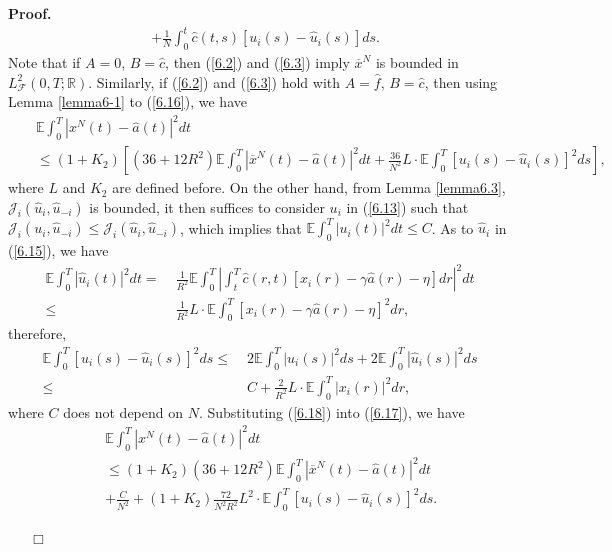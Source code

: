 \documentclass[11pt]{article}
\newenvironment{proof}[1][Proof]{\noindent \textbf{#1.} }{\ \ \  $\Box$}
\def\dbE{\mathbb{E}}
\def\dbR{\mathbb{R}}
\begin{document}
\begin{proof}
\begin{align}
& +\frac{1}{N}\int_{0}^{t}\widehat{c}(t,s)[u_{i}(s)-\widehat{u}_{i}(s)]ds. \label{6.16}
\end{align}
%
Note that if $A=0$, $B=\widehat{c}$, then (\ref{6.2}) and
(\ref{6.3}) imply $\overline{x}^N$ is bounded in
$L^2_{\mathcal{F}}(0,T;\dbR).$ Similarly, if (\ref{6.2}) and
(\ref{6.3}) hold with  $A=\widehat{f}$, $B=\widehat{c}$, then using
Lemma \ref{lemma6-1} to (\ref{6.16}), we have
%
\begin{eqnarray}\label{6.17}
&&\dbE\int_{0}^{T}|x^{N}(t)-\widehat{a}(t)|^{2}dt \nonumber\\ &&\leq
(1+K_2)\left[(36+12R^2)\dbE\int_{0}^{T}|\overline{x}^{N}(t)-\widehat{a}(t)|^{2}dt+\frac{36}{N^{2}}L\cdot
\dbE\int_{0}^{T}[u_{i}(s)-\widehat{u}_{i}(s)]^{2}ds\right],
\end{eqnarray}
%
where $L$ and $K_2$ are defined before.
%
On the other hand, from Lemma \ref{lemma6.3},
$\mathcal{J}_i(\widehat{u}_i,\widehat{u}_{-i})$ is bounded, it then
suffices to consider $u_i$ in (\ref{6.13}) such that
$\mathcal{J}_i(u_i,\widehat{u}_{-i})\leq
\mathcal{J}_i(\widehat{u}_i,\widehat{u}_{-i})$, which implies that
$\dbE\int_0^T|u_i(t)|^2dt\leq C$.  As to $\widehat{u}_i$ in
(\ref{6.15}), we have
%
\begin{align*}
\dbE\int_{0}^{T}|\widehat{u}_{i}(t)|^{2}dt = & \; \frac{1}{R^{2}}\dbE\int_{0}^{T}\left\vert\int_{t}^{T}\widehat{c}(r,t)[x_{i}(r)-\gamma \widehat{a}(r)-\eta ]dr\right\vert ^{2}dt \\
\leq & \; \frac{1}{R^{2}}L\cdot \dbE\int_{0}^{T}[x_{i}(r)-\gamma \widehat{a}(r)-\eta ]^{2}dr,
\end{align*}
%
therefore,
%
\begin{align}
\dbE\int_{0}^{T}[u_{i}(s)-\widehat{u}_{i}(s)]^{2}ds
\leq & \; 2\dbE\int_{0}^{T}|u_{i}(s)|^{2}ds+2\dbE\int_{0}^{T}|\widehat{u}_{i}(s)|^{2}ds \nonumber \\
\leq & \; C+\frac{2}{R^{2}}L\cdot \dbE\int_{0}^{T}|x_{i}(r)|^{2}dr, \label{6.18}
\end{align}
%
where $C$ does not depend on $N$. Substituting (\ref{6.18}) into
(\ref{6.17}), we have
%
\begin{eqnarray}\label{6.19}
&&\dbE\int_{0}^{T}|x^{N}(t)-\widehat{a}(t)|^{2}dt\nonumber\\
&& \leq
(1+K_2)(36+12R^2)\dbE\int_{0}^{T}|\overline{x}^{N}(t)-\widehat{a}(t)|^{2}dt\nonumber
\\
&&+\frac{C}{N^{2}}+ (1+K_2)\frac{72}{N^{2}R^2}L^2\cdot
\dbE\int_{0}^{T}[u_{i}(s)-\widehat{u}_{i}(s)]^{2}ds.
\end{eqnarray}

\end{proof}
\end{document}
